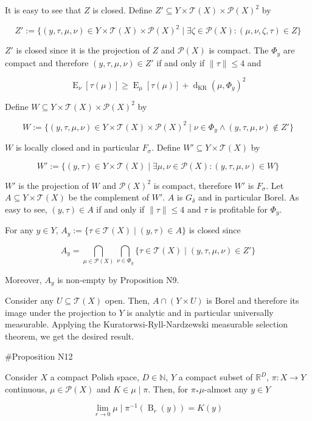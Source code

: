 \documentclass[a4paper]{article}
\DeclareMathOperator{\E}{E}
\newcommand{\Nats}{\mathbb{N}}
\newcommand{\Reals}{\mathbb{R}}
\newcommand{\Norm}[1]{\lVert #1 \rVert}
\newcommand{\Prob}{\mathcal{P}}
\newcommand{\T}{\mathcal{T}}
\newcommand{\Dkr}{\operatorname{d}_{\text{KR}}}
\newcommand{\Ball}{\operatorname{B}}
\begin{document}
It is easy to see that $Z$ is closed. Define $Z' \subseteq Y \times \T(X) \times \Prob(X)^2$ by

$$Z':=\{(y,\tau,\mu,\nu) \in Y \times \T(X) \times \Prob(X)^2 \mid \exists \zeta \in \Prob(X): (\mu,\nu,\zeta,\tau) \in Z\}$$

$Z'$ is closed since it is the projection of $Z$ and $\Prob(X)$ is compact. The $\Phi_y$ are compact and therefore $(y,\tau,\mu,\nu) \in Z'$ if and only if $\Norm{\tau} \leq 4$ and

$$\E_\nu[\tau(\mu)] \geq \E_\mu[\tau(\mu)] + \Dkr(\mu,\Phi_y)^2$$

Define $W \subseteq Y \times \T(X) \times \Prob(X)^2$ by

$$W:=\{(y,\tau,\mu,\nu) \in Y \times \T(X) \times \Prob(X)^2 \mid \nu \in \Phi_y \land (y,\tau,\mu,\nu) \not\in Z'\}$$

$W$ is locally closed and in particular $F_\sigma$. Define $W' \subseteq Y \times \T(X)$ by

$$W':=\{(y,\tau) \in Y \times \T(X) \mid \exists \mu,\nu \in \Prob(X): (y,\tau,\mu,\nu) \in W\}$$

$W'$ is the projection of $W$ and $\Prob(X)^2$ is compact, therefore $W'$ is $F_\sigma$. Let $A \subseteq Y \times \T(X)$ be the complement of $W'$. $A$ is $G_\delta$ and in particular Borel. As easy to see, $(y,\tau) \in A$ if and only if $\Norm{\tau} \leq 4$ and $\tau$ is profitable for $\Phi_y$. 

For any $y \in Y$, $A_y:=\{\tau \in \T(X) \mid (y,\tau) \in A\}$ is closed since

$$A_y = \bigcap_{\mu \in \Prob(X)} \bigcap_{\nu \in \Phi_y} \{\tau \in \T(X) \mid (y,\tau,\mu,\nu) \in Z'\}$$

Moreover, $A_y$ is non-empty by Proposition N9.

Consider any $U \subseteq \T(X)$ open. Then, $A \cap (Y \times U)$ is Borel and therefore its image under the projection to $Y$ is analytic and in particular universally measurable. Applying the Kuratorwsi-Ryll-Nardzewski measurable selection theorem, we get the desired result.

\#Proposition N12

Consider $X$ a compact Polish space, $D \in \Nats$, $Y$ a compact subset of $\Reals^D$, $\pi: X \rightarrow Y$ continuous, $\mu \in \Prob(X)$ and $K \in \mu \mid \pi$. Then, for $\pi_* \mu$-almost any $y \in Y$

$$\lim_{r \rightarrow 0} \mu \mid \pi^{-1}(\Ball_r(y)) = K(y)$$
\end{document}
